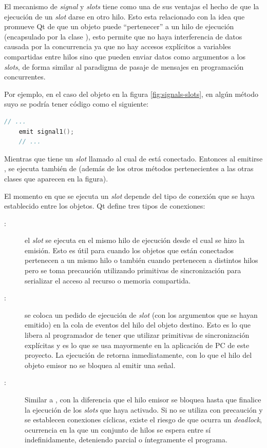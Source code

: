 El mecanismo de \emph{signal} y \emph{slots} tiene como una de sus ventajas el hecho de que la ejecución de un \emph{slot} darse en otro hilo. Esto esta relacionado con la idea que promueve Qt de que un objeto puede \enquote{pertenecer} a un hilo de ejecución (encapsulado por la clase ), esto permite que no haya interferencia de datos causada por la concurrencia ya que no hay accesos explícitos a variables compartidas entre hilos sino que pueden enviar datos como argumentos a los \emph{slots}, de forma similar al paradigma de pasaje de mensajes en programación concurrentes.

Por ejemplo, en el caso del objeto  en la figura \ref{fig:signals-slots}, en algún método suyo se podría tener código como el siguiente:
\begin{lstlisting}[language=c++]
	// ...
	emit signal1();
	// ...
\end{lstlisting}

Mientras que  tiene un \emph{slot} llamado  al cual  de  está conectado. Entonces al emitirse , se ejecuta también  de  (además de los otros métodos pertenecientes a las otras clases que aparecen en la figura).

El momento en que se ejecuta un \emph{slot} depende del tipo de conexión que se haya establecido entre los objetos. Qt define tres tipos de conexiones:
\begin{description}
	\item[:] el \emph{slot} se ejecuta en el mismo hilo de ejecución desde el cual se hizo la emisión. Esto es útil para cuando los objetos que están conectados pertenecen a un mismo hilo o también cuando pertenecen a distintos hilos pero se toma precaución utilizando primitivas de sincronización para serializar el acceso al recurso o memoria compartida.
	\item[:] se coloca un pedido de ejecución de \emph{slot} (con los argumentos que se hayan emitido) en la cola de eventos del hilo del objeto destino. Esto es lo que libera al programador de tener que utilizar primitivas de sincronización explícitas y es lo que se usa mayormente en la aplicación de PC de este proyecto. La ejecución de  retorna inmediatamente, con lo que el hilo del objeto emisor no se bloquea al emitir una señal.
	\item[:] Similar a , con la diferencia que el hilo emisor se bloquea hasta que finalice la ejecución de los \emph{slots} que haya activado. Si no se utiliza con precaución y se establecen conexiones cíclicas, existe el riesgo de que ocurra un \emph{deadlock}, ocurrencia en la que un conjunto de hilos se espera entre sí indefinidamente, deteniendo parcial o íntegramente el programa.
\end{description}


